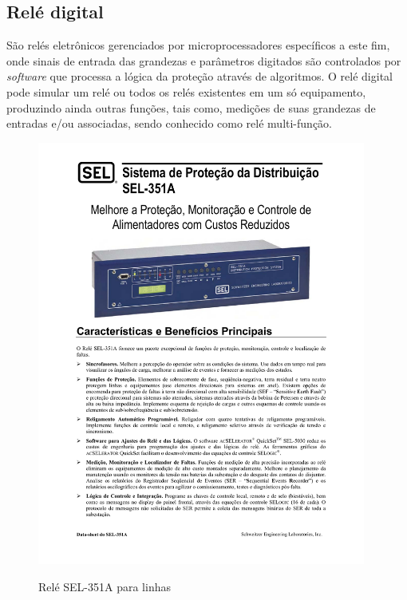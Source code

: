 \documentclass[a5paper,english,spanish,brazil]{ufsc-thesis}
\begin{document}
\subsection{Relé digital}
São relés eletrônicos gerenciados por microprocessadores específicos a este fim, onde sinais de entrada das grandezas e parâmetros digitados são controlados por \textit{software} que processa a lógica da proteção através de algoritmos. O relé digital pode simular um relé ou todos os relés existentes em um só equipamento, produzindo ainda outras funções, tais como, medições de suas grandezas de entradas e/ou associadas, sendo conhecido como relé multi-função.\par

\begin{figure}[htb]
  \caption{Relé SEL-351A para linhas}
  \centering
  \includegraphics[width=10.8cm]{sel.pdf}
  \label{fig:rele}
\end{figure}
\end{document}
